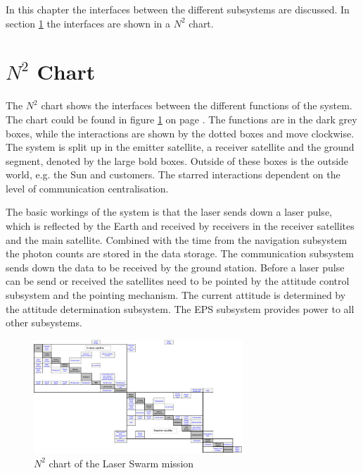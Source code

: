 In this chapter the interfaces between the different subsystems are discussed. In section \ref{sec:n2chart} the interfaces are shown in a $N^2$ chart. 

\section{$N^2$ Chart}
\label{sec:n2chart}
The $N^2$ chart shows the interfaces between the different functions of the system. The chart could be found in figure \ref{fig:n2chart} on page \pageref{fig:n2chart}. The functions are in the dark grey boxes, while the interactions are shown by the dotted boxes and move clockwise. The system is split up in the emitter satellite, a receiver satellite and the ground segment, denoted by the large bold boxes. Outside of these boxes is the outside world, e.g. the Sun and customers. The starred interactions dependent on the level of communication centralisation.

The basic workings of the system is that the laser sends down a laser pulse, which is reflected by the Earth and received by receivers in the receiver satellites and the main satellite. Combined with the time from the navigation subsystem the photon counts are stored in the data storage. The communication subsystem sends down the data to be received by the ground station. Before a laser pulse can be send or received the satellites need to be pointed by the attitude control subsystem and the pointing mechanism. The current attitude is determined by the attitude determination subsystem. The \ac{EPS} subsystem provides power to all other subsystems. 

\begin{figure}
\centering
\includegraphics[angle = 90, width = 0.7\textwidth, bb= 0 0 3421px 1861px]{img/N2chart_wo.png} 
\caption{$N^2$ chart of the Laser Swarm mission}
\label{fig:n2chart}
\end{figure}